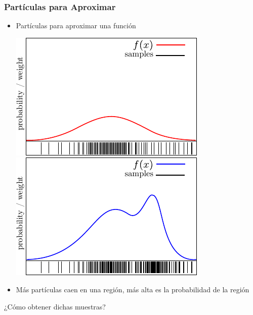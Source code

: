 \begin{frame}
    \frametitle{Partículas para Aproximar}
    
    \begin{itemize}
        \item Partículas para aproximar una función
        
        \begin{center}
            \includegraphics[width=0.45\columnwidth]{./images/particle_filter/gaussian_approximation_by_sampling.pdf}
            \includegraphics[width=0.45\columnwidth]{./images/particle_filter/particles_for_approximation.pdf}
        \end{center}

        \item Más partículas caen en una región, más alta es la probabilidad de la región
    \end{itemize}
    
    \begin{center}
        \alert{¿Cómo obtener dichas muestras?}
    \end{center}

\end{frame}

